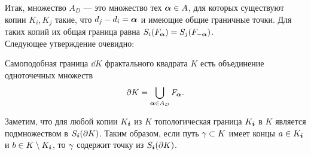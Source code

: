Итак, множество $A_D$ --- это множество тех ${\bm{\alpha}}\in A$, для которых существуют копии $K_i, K_j$ такие, что $d_j-d_i={\bm{\alpha}}$ и имеющие общие граничные точки. 
Для таких копий их общая граница равна $S_i(F_{\bm{\alpha}})=S_j(F_{-{\bm{\alpha}}})$.\\

Следующее утверждение очевидно:

\begin{proposition}\label{prop:dd}
Самоподобная граница $\dd K$ фрактального квадрата $K$ есть объединение одноточечных множеств
$$\partial K=\bigcup\limits_{{\bm{\alpha}}\in A_D}F_{\bm{\alpha}}.$$
\end{proposition}

Заметим, что для любой копии $K_{\bm{i}}$ из $K$ топологическая граница $K_{\bm{i}}$ в $K$ является подмножеством в 
$S_{\bm{i}}(\partial K)$. 
Таким образом, если путь $\gamma\subset K$ имеет концы $a\in K_{\bm{i}}$ и $b\in K\setminus K_{\bm{i}}$, то $\gamma$ содержит точку из $S_{\bm{i}}(\partial K)$.

